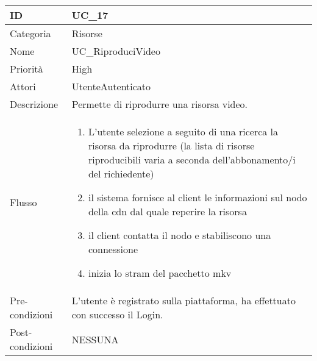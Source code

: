 \begin{center}
\begin{tabular}{ |p{2cm}|p{13cm}|  }
\hline
ID & UC\_17 \\\hline
Categoria & Risorse\\\hline
Nome & UC\_RiproduciVideo\\\hline
Priorità & High \\\hline
Attori &  UtenteAutenticato \\\hline
Descrizione & Permette di riprodurre una risorsa video.\\\hline
Flusso &  	\begin{enumerate}
			\item L'utente selezione a seguito di una ricerca la risorsa da riprodurre (la lista di risorse riproducibili varia a seconda dell'abbonamento/i del richiedente)
			\item il sistema fornisce al client le informazioni sul nodo della cdn dal quale reperire la risorsa 
			\item il client contatta il nodo e stabiliscono una connessione
			\item inizia lo stram del pacchetto mkv 
			\end{enumerate}
			\\\hline
Pre-condizioni & L'utente è registrato sulla piattaforma, ha effettuato con successo il Login.\\\hline
Post-condizioni & NESSUNA\\\hline
\end{tabular}
\label{table_use_case:17}\newline


\end{center}
